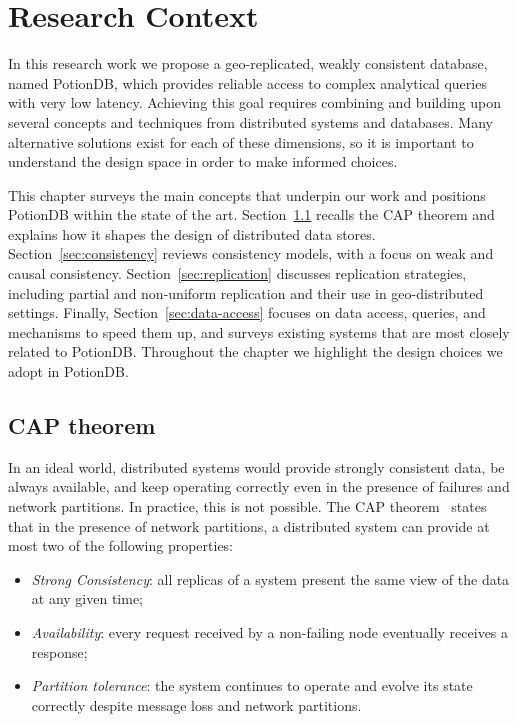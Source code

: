 \chapter{Research Context}
\label{cha:research_context}

In this research work we propose a geo-replicated, weakly consistent database,
named PotionDB, which provides reliable access to complex analytical queries with
very low latency. Achieving this goal requires combining and building upon several
concepts and techniques from distributed systems and databases. Many alternative
solutions exist for each of these dimensions, so it is important to understand the
design space in order to make informed choices.

This chapter surveys the main concepts that underpin our work and positions
PotionDB within the state of the art. Section~\ref{sec:cap} recalls the CAP
theorem and explains how it shapes the design of distributed data stores.
Section~\ref{sec:consistency} reviews consistency models, with a focus on weak and
causal consistency. Section~\ref{sec:replication} discusses replication strategies,
including partial and non-uniform replication and their use in geo-distributed
settings. Finally, Section~\ref{sec:data-access} focuses on data access, queries,
and mechanisms to speed them up, and surveys existing systems that are most
closely related to PotionDB. Throughout the chapter we highlight the design
choices we adopt in PotionDB.

\section{CAP theorem}
\label{sec:cap}

In an ideal world, distributed systems would provide strongly consistent data, be
always available, and keep operating correctly even in the presence of failures and
network partitions. In practice, this is not possible. The CAP theorem~\cite{cap}
states that in the presence of network partitions, a distributed system can provide
at most two of the following properties:

\begin{itemize}
  \item \emph{Strong Consistency}: all replicas of a system present the same view of
        the data at any given time;
  \item \emph{Availability}: every request received by a non-failing node eventually
        receives a response;
  \item \emph{Partition tolerance}: the system continues to operate and evolve its
        state correctly despite message loss and network partitions.
\end{itemize}

